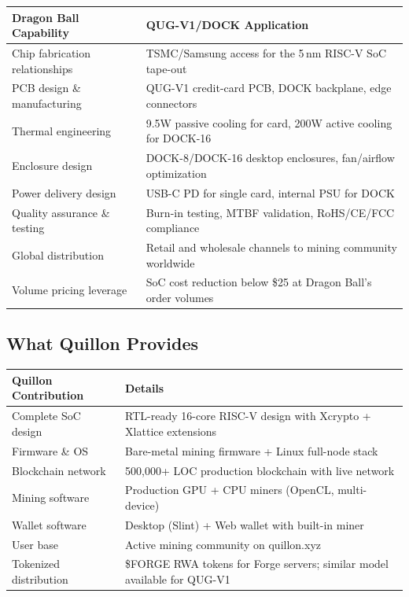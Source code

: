 \documentclass[11pt,a4paper]{article}
\begin{document}
\begin{center}
\begin{tabular}{@{}p{4.5cm}p{9.5cm}@{}}
\toprule
\textbf{Dragon Ball Capability} & \textbf{QUG-V1/DOCK Application} \\
\midrule
Chip fabrication relationships & TSMC/Samsung access for the 5\,nm RISC-V SoC tape-out \\
PCB design \& manufacturing & QUG-V1 credit-card PCB, DOCK backplane, edge connectors \\
Thermal engineering & 9.5W passive cooling for card, 200W active cooling for DOCK-16 \\
Enclosure design & DOCK-8/DOCK-16 desktop enclosures, fan/airflow optimization \\
Power delivery design & USB-C PD for single card, internal PSU for DOCK \\
Quality assurance \& testing & Burn-in testing, MTBF validation, RoHS/CE/FCC compliance \\
Global distribution & Retail and wholesale channels to mining community worldwide \\
Volume pricing leverage & SoC cost reduction below \$25 at Dragon Ball's order volumes \\
\bottomrule
\end{tabular}
\end{center}

\subsection{What Quillon Provides}

\begin{center}
\begin{tabular}{@{}p{4.5cm}p{9.5cm}@{}}
\toprule
\textbf{Quillon Contribution} & \textbf{Details} \\
\midrule
Complete SoC design & RTL-ready 16-core RISC-V design with Xcrypto + Xlattice extensions \\
Firmware \& OS & Bare-metal mining firmware + Linux full-node stack \\
Blockchain network & 500{,}000+ LOC production blockchain with live network \\
Mining software & Production GPU + CPU miners (OpenCL, multi-device) \\
Wallet software & Desktop (Slint) + Web wallet with built-in miner \\
User base & Active mining community on quillon.xyz \\
Tokenized distribution & \$FORGE RWA tokens for Forge servers; similar model available for QUG-V1 \\
\bottomrule
\end{tabular}
\end{center}
\end{document}
